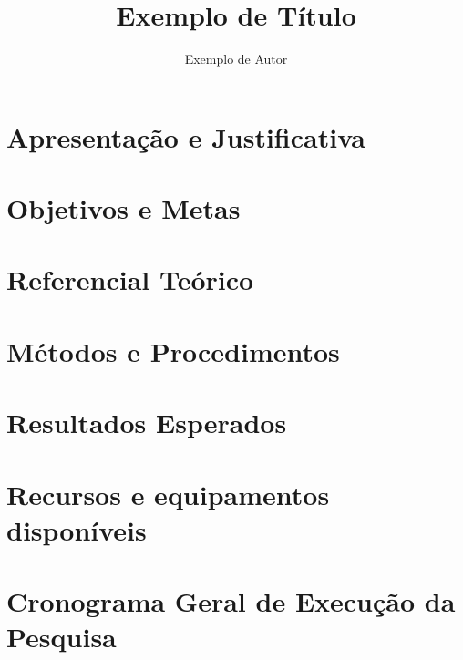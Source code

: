 \documentclass{article}
\begin{document}
\author{Exemplo de Autor}
\title{Exemplo de Título}


\coverpage
\aboutpage

\section{Apresentação e Justificativa}
\lipsum[2-5]

\section{Objetivos e Metas}
\lipsum[2-5]

\section{Referencial Teórico}
\lipsum[2-5]

\section{Métodos e Procedimentos}
\lipsum[2-5]

\section{Resultados Esperados}
\lipsum[2-5]

\section{Recursos e equipamentos disponíveis}
\lipsum[2-5]

\section{Cronograma Geral de Execução da Pesquisa}

\end{document}
